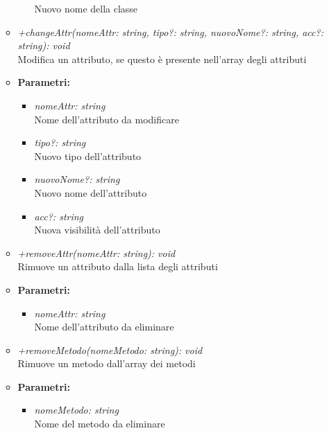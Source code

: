 \begin{itemize}
\begin{itemize}
\begin{itemize}
            					Nuovo nome della classe
            				\end{itemize}
            			\item \emph{+changeAttr(nomeAttr: string, tipo?: string, nuovoNome?: string, acc?: string): void}\\
            			Modifica un attributo, se questo è presente nell'array degli attributi
            			\item \textbf{Parametri:}\\
            				\begin{itemize}
            					\item \emph{nomeAttr: string}\\
            					Nome dell'attributo da modificare
            					\item \emph{tipo?: string}\\
            					Nuovo tipo dell'attributo
            					\item \emph{nuovoNome?: string}\\
            					Nuovo nome dell'attributo
            					\item \emph{acc?: string}\\
            					Nuova visibilità dell'attributo
            				\end{itemize}
            			\item \emph{+removeAttr(nomeAttr: string): void}\\
            			Rimuove un attributo dalla lista degli attributi
            			\item \textbf{Parametri:}\\
            				\begin{itemize}
            					\item \emph{nomeAttr: string}\\
            					Nome dell'attributo da eliminare
            				\end{itemize}
            			\item \emph{+removeMetodo(nomeMetodo: string): void}\\
            			Rimuove un metodo dall'array dei metodi
            			\item \textbf{Parametri:}\\
            				\begin{itemize}
            					\item \emph{nomeMetodo: string}\\
            					Nome del metodo da eliminare
            				\end{itemize}

\end{itemize}
\end{itemize}
